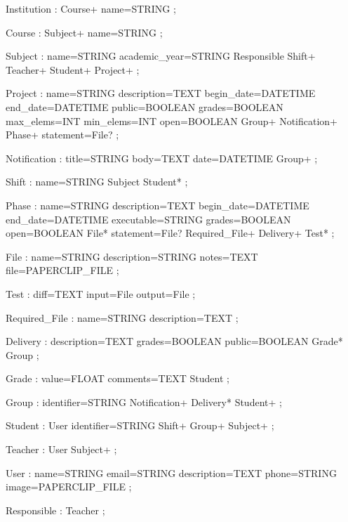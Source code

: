 \begin{spverbatim}
Institution : Course+ name=STRING 
            ;

Course : Subject+ name=STRING 
       ;

Subject : name=STRING academic_year=STRING Responsible Shift+ Teacher+ Student+ Project+ 
        ;

Project : name=STRING description=TEXT begin_date=DATETIME end_date=DATETIME public=BOOLEAN grades=BOOLEAN max_elems=INT min_elems=INT open=BOOLEAN Group+ Notification+ Phase+ statement=File?
        ;

Notification : title=STRING body=TEXT date=DATETIME Group+ 
             ;

Shift : name=STRING Subject Student* 
      ;

Phase : name=STRING description=TEXT begin_date=DATETIME end_date=DATETIME executable=STRING grades=BOOLEAN open=BOOLEAN File* statement=File? Required_File+ Delivery+ Test* 
      ;

File : name=STRING description=STRING notes=TEXT file=PAPERCLIP_FILE 
     ;

Test : diff=TEXT input=File output=File 
     ;

Required_File : name=STRING description=TEXT 
              ;

Delivery : description=TEXT grades=BOOLEAN public=BOOLEAN Grade* Group 
         ;

Grade : value=FLOAT comments=TEXT Student 
      ;

Group : identifier=STRING Notification+ Delivery* Student+ 
      ;

Student : User identifier=STRING Shift+ Group+ Subject+ 
        ;

Teacher : User Subject+ 
        ;

User : name=STRING email=STRING description=TEXT phone=STRING image=PAPERCLIP_FILE 
     ;

Responsible : Teacher 
            ;            
\end{spverbatim}


\newpage
